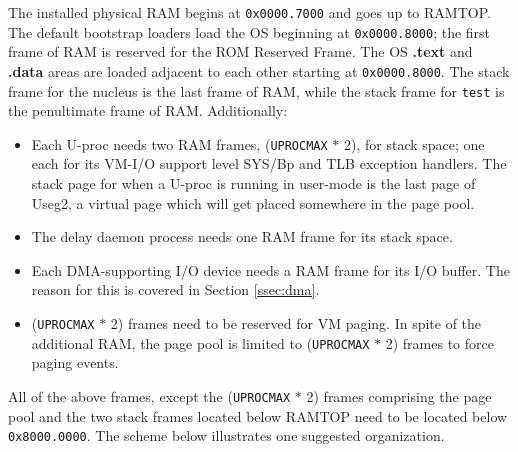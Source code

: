 The installed physical RAM begins at \texttt{0x0000.7000} and goes up to RAMTOP. 
The default bootstrap loaders load the OS beginning at \texttt{0x0000.8000}; the first frame of RAM is reserved for the ROM Reserved Frame. 
The OS \textbf{.text} and \textbf{.data} areas are loaded adjacent to each other starting at \texttt{0x0000.8000}. 
The stack frame for the nucleus is the last frame of RAM, while the stack frame for \verb+test+ is the penultimate frame of RAM. 
Additionally:
\begin{itemize}
\item Each U-proc needs two RAM frames, (\verb+UPROCMAX+ $*$ 2), for stack space; one each for its VM-I/O support level SYS/Bp and TLB exception handlers.
The stack page for when a U-proc is running in user-mode is the last page of Useg2, a virtual page which will get placed somewhere in the page pool.
\item  The delay daemon process needs one RAM frame for its stack space.
\item Each DMA-supporting I/O device needs a RAM frame for its I/O buffer.
The reason for this is covered in Section \ref{ssec:dma}.
\item (\verb+UPROCMAX+ $*$ 2) frames need to be reserved for VM paging. In spite of the additional RAM, the page pool is limited to (\verb+UPROCMAX+ $*$ 2) frames to force paging events.
\end{itemize}

All of the above frames, except the (\verb+UPROCMAX+ $*$ 2) frames comprising the page pool and the two stack frames located below RAMTOP need to be located below \texttt{0x8000.0000}. The scheme below illustrates one suggested organization.

